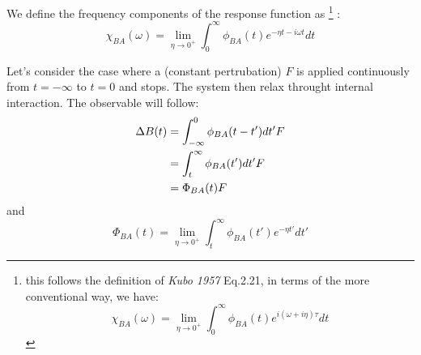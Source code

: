 \documentclass{article}
\begin{document}
We define the frequency components of the response function as
\footnote{this follows the definition of \emph{Kubo 1957} Eq.2.21, in terms
of the more conventional way, we have:
\begin{equation}
    \chi_{BA}(\omega) = \lim_{\eta\to 0^+} \int_{0}^{\infty} \phi_{BA} (t) e^{i(\omega+i\eta)\tau} dt
\end{equation}
}
:
\begin{equation}
    \chi_{BA}(\omega) = \lim_{\eta\to 0^+} \int_{0}^{\infty} \phi_{BA} (t) e^{-\eta t-i\omega t} dt
\end{equation}

Let's consider the case where a (constant pertrubation) $F$ is applied continuously from $t = -\infty$ to 
$t = 0$ and stops. The system then relax throught internal interaction. The observable will
follow:
\begin{align}
    \Delta B(t) &= \int_{-\infty}^{0} \phi_{BA} (t-t') dt' F \notag \\
                &= \int_{t}^{\infty} \phi_{BA} (t') dt' F \notag \\
                &= \Phi_{BA} (t) F
\end{align}
and
\begin{equation}
    \Phi_{BA} (t) = \lim_{\eta\to 0^+} \int_{t}^{\infty} \phi_{BA} (t') e^{-\eta t'} dt'
\end{equation}
\end{document}

